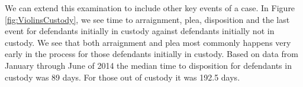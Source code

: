 We can extend this examination to include other key events of a case. In Figure \ref{fig:ViolinsCustody}, we see time to arraignment, plea, disposition and the last event for defendants initially in custody against defendants initially not in custody. We see that both arraignment and plea most commonly happens very early in the process for those defendants initially in custody. Based on data from January through June of 2014 the median time to disposition for defendants in custody was 89 days. For those out of custody it was 192.5 days.